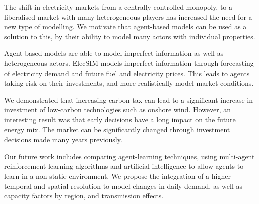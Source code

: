 
The shift in electricity markets from a centrally controlled monopoly, to a liberalised market with many heterogeneous players has increased the need for a new type of modelling. We motivate that agent-based models can be used as a solution to this, by their ability to model many actors with individual properties. 

Agent-based models are able to model imperfect information as well as heterogeneous actors. ElecSIM models imperfect information through forecasting of electricity demand and future fuel and electricity prices. This leads to agents taking risk on their investments, and more realistically model market conditions.

We demonstrated that increasing carbon tax can lead to a significant increase in investment of low-carbon technologies such as onshore wind. However, an interesting result was that early decisions have a long impact on the future energy mix. The market can be significantly changed through investment decisions made many years previously. 

Our future work includes comparing agent-learning techniques, using multi-agent reinforcement learning algorithms and artificial intelligence to allow agents to learn in a non-static environment. We propose the integration of a higher temporal and spatial resolution to model changes in daily demand, as well as capacity factors by region, and transmission effects.


\FloatBarrier